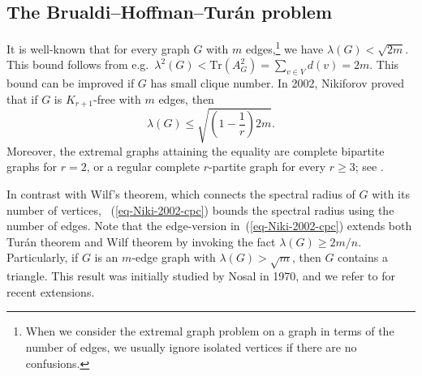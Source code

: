 \documentclass[11pt,a4paper]{article}
\theoremstyle{definition}
\theoremstyle{remark}
\begin{document}
\subsection{The Brualdi--Hoffman--Tur\'{a}n problem}

It is well-known that  for every graph $G$ with $m$ edges,\footnote{When we consider the extremal graph problem on a graph in terms of the number of edges, we usually ignore isolated vertices if there are no confusions.} we have
$\lambda (G)< \sqrt{2m}$. 
This bound follows from e.g.~$\lambda^2(G)< \mathrm{Tr}(A^2_G) = \sum_{v\in V}d(v)=2m$.   
This bound can be improved if $G$ has small clique number. In 2002, Nikiforov \cite{Niki2002} proved that if $G$ is $K_{r+1}$-free with $m$ edges, then 
\begin{equation}
    \label{eq-Niki-2002-cpc}
    \lambda (G)\le \sqrt{\left(1- \frac{1}{r} \right)2m}.
\end{equation}
Moreover, the extremal graphs attaining the equality are complete bipartite graphs for $r=2$, or a regular complete $r$-partite graph for every $r\ge 3$; see \cite{Niki2006-walks,Niki2009jctb}.

In contrast with Wilf's theorem, which connects the spectral radius of $G$ with its number of vertices, 
~(\ref{eq-Niki-2002-cpc}) bounds the spectral radius using the number of edges. Note that the edge-version in~(\ref{eq-Niki-2002-cpc}) extends both Tur\'an theorem and Wilf theorem by invoking the fact $\lambda (G)\ge 2m/n$. 
Particularly, if $G$ is an $m$-edge graph with $\lambda (G)> \sqrt{m}$, then $G$ contains a triangle. 
This result was initially studied by Nosal \cite{Nos1970} in 1970, and we refer to \cite{Niki2021, NZ2021, LLZ2024-book-qua} for recent extensions. 
\end{document}
